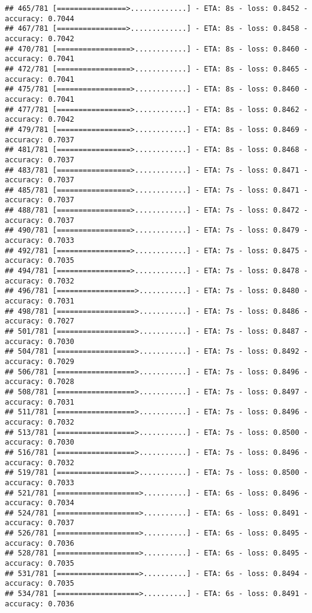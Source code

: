 \documentclass[
]{article}
\begin{document}
\begin{verbatim}
## 465/781 [================>.............] - ETA: 8s - loss: 0.8452 - accuracy: 0.7044
## 467/781 [================>.............] - ETA: 8s - loss: 0.8458 - accuracy: 0.7042
## 470/781 [=================>............] - ETA: 8s - loss: 0.8460 - accuracy: 0.7041
## 472/781 [=================>............] - ETA: 8s - loss: 0.8465 - accuracy: 0.7041
## 475/781 [=================>............] - ETA: 8s - loss: 0.8460 - accuracy: 0.7041
## 477/781 [=================>............] - ETA: 8s - loss: 0.8462 - accuracy: 0.7042
## 479/781 [=================>............] - ETA: 8s - loss: 0.8469 - accuracy: 0.7037
## 481/781 [=================>............] - ETA: 8s - loss: 0.8468 - accuracy: 0.7037
## 483/781 [=================>............] - ETA: 7s - loss: 0.8471 - accuracy: 0.7037
## 485/781 [=================>............] - ETA: 7s - loss: 0.8471 - accuracy: 0.7037
## 488/781 [=================>............] - ETA: 7s - loss: 0.8472 - accuracy: 0.7037
## 490/781 [=================>............] - ETA: 7s - loss: 0.8479 - accuracy: 0.7033
## 492/781 [=================>............] - ETA: 7s - loss: 0.8475 - accuracy: 0.7035
## 494/781 [=================>............] - ETA: 7s - loss: 0.8478 - accuracy: 0.7032
## 496/781 [==================>...........] - ETA: 7s - loss: 0.8480 - accuracy: 0.7031
## 498/781 [==================>...........] - ETA: 7s - loss: 0.8486 - accuracy: 0.7027
## 501/781 [==================>...........] - ETA: 7s - loss: 0.8487 - accuracy: 0.7030
## 504/781 [==================>...........] - ETA: 7s - loss: 0.8492 - accuracy: 0.7029
## 506/781 [==================>...........] - ETA: 7s - loss: 0.8496 - accuracy: 0.7028
## 508/781 [==================>...........] - ETA: 7s - loss: 0.8497 - accuracy: 0.7031
## 511/781 [==================>...........] - ETA: 7s - loss: 0.8496 - accuracy: 0.7032
## 513/781 [==================>...........] - ETA: 7s - loss: 0.8500 - accuracy: 0.7030
## 516/781 [==================>...........] - ETA: 7s - loss: 0.8496 - accuracy: 0.7032
## 519/781 [==================>...........] - ETA: 7s - loss: 0.8500 - accuracy: 0.7033
## 521/781 [===================>..........] - ETA: 6s - loss: 0.8496 - accuracy: 0.7034
## 524/781 [===================>..........] - ETA: 6s - loss: 0.8491 - accuracy: 0.7037
## 526/781 [===================>..........] - ETA: 6s - loss: 0.8495 - accuracy: 0.7036
## 528/781 [===================>..........] - ETA: 6s - loss: 0.8495 - accuracy: 0.7035
## 531/781 [===================>..........] - ETA: 6s - loss: 0.8494 - accuracy: 0.7035
## 534/781 [===================>..........] - ETA: 6s - loss: 0.8491 - accuracy: 0.7036

\end{verbatim}
\end{document}
